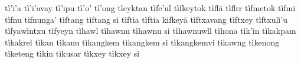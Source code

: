 \documentclass[a4paper]{article}
\begin{document}
tì'i'a\hspace{2mm}
tì'i'avay\hspace{2mm}
tì'ipu\hspace{2mm}
tì'o'\hspace{2mm}
tì'ong\hspace{2mm}
tìeyktan\hspace{2mm}
tìfe'ul\hspace{2mm}
tìfkeytok\hspace{2mm}
tìflä\hspace{2mm}
tìflrr\hspace{2mm}
tìfmetok\hspace{2mm}
tìfmi\hspace{2mm}
tìfnu\hspace{2mm}
tìfnunga'\hspace{2mm}
tìftang\hspace{2mm}
tìftang si\hspace{2mm}
tìftia\hspace{2mm}
tìftia kifkeyä\hspace{2mm}
tìftxavang\hspace{2mm}
tìftxey\hspace{2mm}
tìftxulì'u\hspace{2mm}
tìfyawìntxu\hspace{2mm}
tìfyeyn\hspace{2mm}
tìhawl\hspace{2mm}
tìhawnu\hspace{2mm}
tìhawnu si\hspace{2mm}
tìhawnuwll\hspace{2mm}
tìhona\hspace{2mm}
tìk'ìn\hspace{2mm}
tìkakpam\hspace{2mm}
tìkakrel\hspace{2mm}
tìkan\hspace{2mm}
tìkanu\hspace{2mm}
tìkangkem\hspace{2mm}
tìkangkem si\hspace{2mm}
tìkangkemvi\hspace{2mm}
tìkawng\hspace{2mm}
tìkenong\hspace{2mm}
tìketeng\hspace{2mm}
tìkin\hspace{2mm}
tìkusar\hspace{2mm}
tìkxey\hspace{2mm}
tìkxey si\hspace{2mm}
\end{document}
